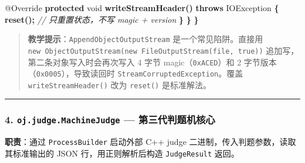 \documentclass[
  11pt,
]{ctexart}
\newenvironment{Shaded}{\begin{snugshade}}{\end{snugshade}}
\newcommand{\AttributeTok}[1]{\textcolor[rgb]{0.13,0.29,0.53}{#1}}
\newcommand{\BuiltInTok}[1]{#1}
\newcommand{\CommentTok}[1]{\textcolor[rgb]{0.56,0.35,0.01}{\textit{#1}}}
\newcommand{\DataTypeTok}[1]{\textcolor[rgb]{0.13,0.29,0.53}{#1}}
\newcommand{\FunctionTok}[1]{\textcolor[rgb]{0.13,0.29,0.53}{\textbf{#1}}}
\newcommand{\KeywordTok}[1]{\textcolor[rgb]{0.13,0.29,0.53}{\textbf{#1}}}
\newcommand{\OperatorTok}[1]{\textcolor[rgb]{0.81,0.36,0.00}{\textbf{#1}}}
\begin{document}
\begin{Shaded}
\begin{Highlighting}[]
        \AttributeTok{@Override}
        \KeywordTok{protected} \DataTypeTok{void} \FunctionTok{writeStreamHeader}\OperatorTok{()} \KeywordTok{throws} \BuiltInTok{IOException} \OperatorTok{\{}
            \FunctionTok{reset}\OperatorTok{();}  \CommentTok{// 只重置状态，不写 magic + version}
        \OperatorTok{\}}
    \OperatorTok{\}}
\OperatorTok{\}}
\end{Highlighting}
\end{Shaded}

\begin{quote}
\textbf{教学提示}：\texttt{AppendObjectOutputStream}
是一个常见陷阱。直接用
\texttt{new\ ObjectOutputStream(new\ FileOutputStream(file,\ true))}
追加写，第二条对象写入时会再次写入 4 字节 magic（\texttt{0xACED}）和 2
字节版本（\texttt{0x0005}），导致读回时
\texttt{StreamCorruptedException}。覆盖 \texttt{writeStreamHeader()}
改为 \texttt{reset()} 是标准解法。
\end{quote}

\begin{center}\rule{0.5\linewidth}{0.5pt}\end{center}

\hypertarget{oj.judge.machinejudge-ux7b2cux4e09ux4ee3ux5224ux9898ux673aux6838ux5fc3}{%
\subsubsection{\texorpdfstring{4. \texttt{oj.judge.MachineJudge} ---
第三代判题机核心}{4. oj.judge.MachineJudge --- 第三代判题机核心}}\label{oj.judge.machinejudge-ux7b2cux4e09ux4ee3ux5224ux9898ux673aux6838ux5fc3}}

\textbf{职责}：通过 \texttt{ProcessBuilder} 启动外部 C++ judge
二进制，传入判题参数，读取其标准输出的 JSON 行，用正则解析后构造
\texttt{JudgeResult} 返回。
\end{document}
